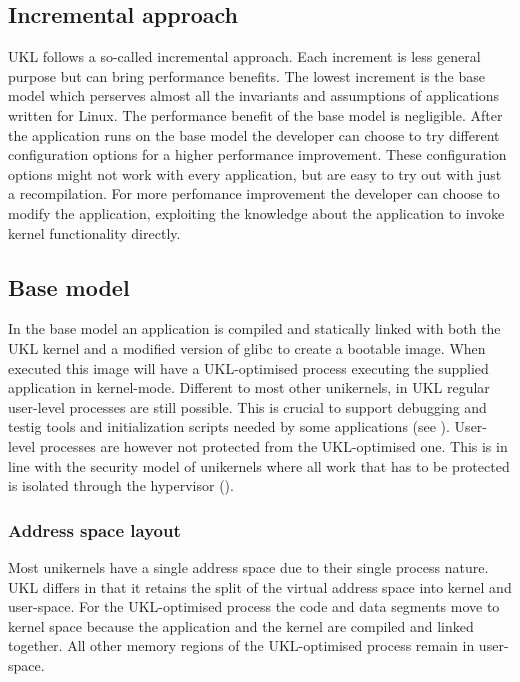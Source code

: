 \documentclass[10pt,twocolumn,a4paper]{article}
\begin{document}
  \subsection{Incremental approach}
    UKL follows a so-called incremental approach. 
    Each increment is less general purpose but can bring performance benefits.
    The lowest increment is the base model which perserves almost all the 
    invariants and assumptions of applications written for Linux.
    The performance benefit of the base model is negligible.
    After the application runs on the base model the developer can choose to try different
    configuration options for a higher performance improvement.
    These configuration options might not work with every application, but are easy to try out
    with just a recompilation.
    For more perfomance improvement the developer can choose to modify the application, exploiting the
    knowledge about the application to invoke kernel functionality directly.

  \subsection{Base model}
    In the base model an application is compiled and statically linked with both 
    the UKL kernel and a modified version of glibc to create a bootable image.
    When executed this image will have a UKL-optimised process executing the supplied 
    application in kernel-mode.
    Different to most other unikernels, in UKL regular user-level processes are still possible.
    This is crucial to support debugging and testig tools and initialization scripts needed by
    some applications (see ).
    User-level processes are however not protected from the UKL-optimised one.
    This is in line with the security model of unikernels where all work that has to 
    be protected is isolated through the hypervisor ().

    \subsubsection{Address space layout}
      Most unikernels have a single address space due to their single process nature.
      UKL differs in that it retains the split of the virtual address space into kernel and user-space.
      For the UKL-optimised process the code and data segments move to kernel space because
      the application and the kernel are compiled and linked together.
      All other memory regions of the UKL-optimised process remain in user-space.
\end{document}
